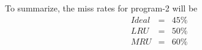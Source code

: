 \documentclass{tufte-handout}
\begin{document}
	To summarize, the miss rates for program-2 will be
	\begin{eqnarray*}
		Ideal &=& 45\% \\
		LRU &=& 50\% \\
		MRU &=& 60\% \\
	\end{eqnarray*}




		
  
  
  
  
\end{document}
